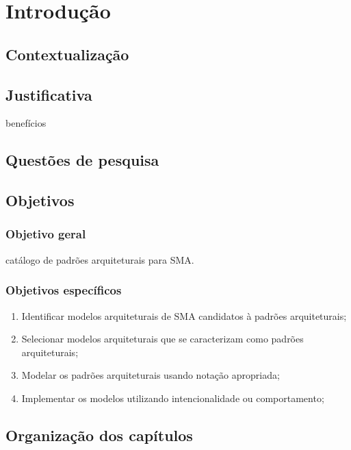 \chapter[Introdução]{Introdução}\label{ch:introducao}

\section{Contextualização}

\section{Justificativa}

benefícios

\section{Questões de pesquisa}

\section{Objetivos}

\subsection{Objetivo geral}

catálogo de padrões
arquiteturais para SMA.

\subsection{Objetivos específicos}

\begin{enumerate}
    \item Identificar modelos arquiteturais de SMA candidatos à padrões arquiteturais;
    \item Selecionar modelos arquiteturais que se caracterizam como padrões arquiteturais; 
    \item Modelar os padrões arquiteturais usando notação apropriada;
    \item Implementar os modelos utilizando intencionalidade ou comportamento;
\end{enumerate}

\section{Organização dos capítulos}
    
